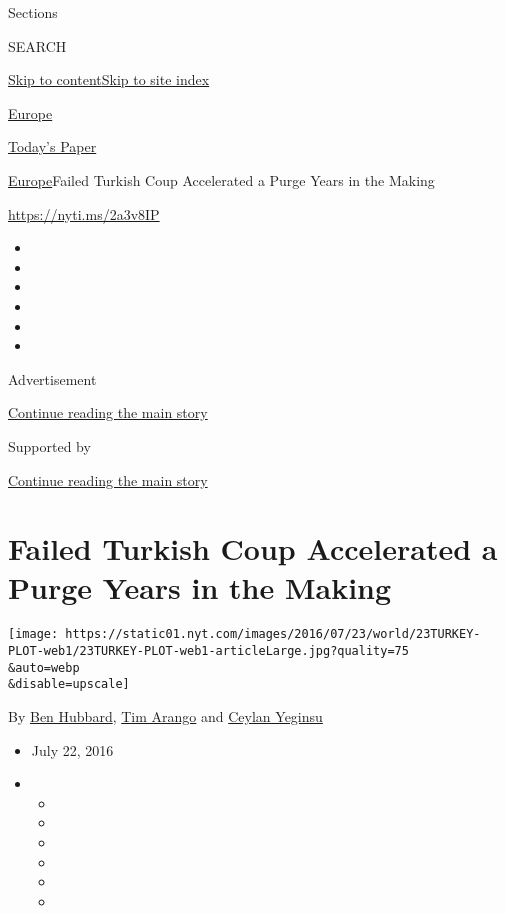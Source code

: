Sections

SEARCH

\protect\hyperlink{site-content}{Skip to
content}\protect\hyperlink{site-index}{Skip to site index}

\href{https://www.nytimes.com/section/world/europe}{Europe}

\href{https://myaccount.nytimes.com/auth/login?response_type=cookie\&client_id=vi}{}

\href{https://www.nytimes.com/section/todayspaper}{Today's Paper}

\href{/section/world/europe}{Europe}\textbar{}Failed Turkish Coup
Accelerated a Purge Years in the Making

\url{https://nyti.ms/2a3v8IP}

\begin{itemize}
\item
\item
\item
\item
\item
\item
\end{itemize}

Advertisement

\protect\hyperlink{after-top}{Continue reading the main story}

Supported by

\protect\hyperlink{after-sponsor}{Continue reading the main story}

\hypertarget{failed-turkish-coup-accelerated-a-purge-years-in-the-making}{%
\section{Failed Turkish Coup Accelerated a Purge Years in the
Making}\label{failed-turkish-coup-accelerated-a-purge-years-in-the-making}}

\texttt{[image: https://static01.nyt.com/images/2016/07/23/world/23TURKEY-PLOT-web1/23TURKEY-PLOT-web1-articleLarge.jpg?quality=75\\\&auto=webp\\\&disable=upscale]}

By \href{http://www.nytimes.com/by/ben-hubbard}{Ben Hubbard},
\href{http://www.nytimes.com/by/tim-arango}{Tim Arango} and
\href{http://www.nytimes.com/by/ceylan-yeginsu}{Ceylan Yeginsu}

\begin{itemize}
\item
  July 22, 2016
\item
  \begin{itemize}
  \item
  \item
  \item
  \item
  \item
  \item
  \end{itemize}
\end{itemize}

